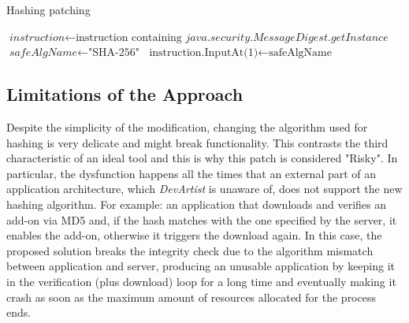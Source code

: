 \begin{algorithm}
\caption{Hashing patching}\label{euclid}
\begin{algorithmic}[1]
\State $\textit{instruction} \gets \text{instruction containing }\textit{java.security.MessageDigest.getInstance}$
\State $\textit{safeAlgName} \gets \text{"SHA-256"}$
\State $\text{instruction.InputAt(1)} \gets \text{safeAlgName}$
\EndProcedure
\end{algorithmic}
\end{algorithm}

\subsection{Limitations of the Approach}
Despite the simplicity of the modification, changing the algorithm used for hashing is very delicate and might break functionality. This contrasts the third characteristic of an ideal tool and this is why this patch is considered "Risky". In particular, the dysfunction happens all the times that an external part of an application architecture, which \emph{DevArtist} is unaware of, does not support the new hashing algorithm. For example: an application that downloads and verifies an add-on via MD5 and, if the hash matches with the one specified by the server, it enables the add-on, otherwise it triggers the download again. In this case, the proposed solution breaks the integrity check due to the algorithm mismatch between application and server, producing an unusable application by keeping it in the verification (plus download) loop for a long time and eventually making it crash as soon as the maximum amount of resources allocated for the process ends.


